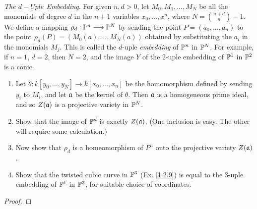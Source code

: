 \label{1.2.12}

\textit{The $d-Uple$ Embedding}. For given $n, d > 0$, let $M_0, M_1, \dots ,M_N$ be all the monomials of degree $d$ in the $n + 1$ variables $x_0 , \dots, x^n$, where $N = \binom{n + d}{n} - 1$. We
define a mapping $\rho_d: \P^n \longrightarrow \P^N$ by sending the point $P = (a_0, \dots ,a_n)$ to the point $\rho_d(P) = (M_0(a), \dots ,M_N(a))$ obtained by substituting the $a_i$ in the monomials $M_j$. This is called the $d$-uple \textit{embedding} of $\P^n$ in $\P^N$. For example, if $n = 1$, $d = 2$, then
$N = 2$, and the image $Y$ of the 2-uple embedding of $\P^1$ in $\P^2$ is a conic.

\begin{enumerate}[label = (\alph*)]
    \item Let $\theta: k[y_0 , \dots, y_N] \longrightarrow k[x_0 , \dots, x_n]$ be the homomorphism defined by sending $y_i$ to $M_i$, and let $\a$ be the kernel of $\theta$. Then $\a$ is a homogeneous prime ideal, and so $Z(\a)$ is a projective variety in $\P^N$.
    
    \item Show that the image of $\P^d$ is exactly $Z(\a)$. (One inclusion is easy. The other will require some calculation.)
    
    \item Now show that $\rho_d$ is a homeomorphism of $P^n$ onto the projective variety $Z(\a)$.
    
    \item Show that the twisted cubic curve in $\P^3$ (Ex. \ref{1.2.9}) is equal to the 3-uple embedding of $\P^1$ in $\P^3$, for suitable choice of coordinates.
\end{enumerate}

\begin{proof}
    
\end{proof}